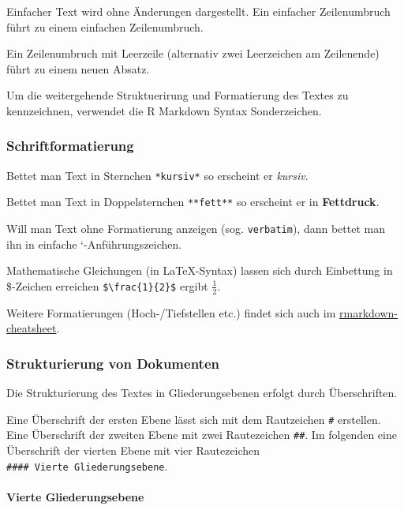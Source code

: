 \documentclass[
]{article}
\begin{document}
Einfacher Text wird ohne Änderungen dargestellt. Ein einfacher
Zeilenumbruch führt zu einem einfachen Zeilenumbruch.

Ein Zeilenumbruch mit Leerzeile (alternativ zwei Leerzeichen am
Zeilenende) führt zu einem neuen Absatz.

Um die weitergehende Struktuerirung und Formatierung des Textes zu
kennzeichnen, verwendet die R Markdown Syntax Sonderzeichen.

\hypertarget{schriftformatierung}{%
\subsubsection{Schriftformatierung}\label{schriftformatierung}}

Bettet man Text in Sternchen \texttt{*kursiv*} so erscheint er
\emph{kursiv}.

Bettet man Text in Doppelsternchen \texttt{**fett**} so erscheint er in
\textbf{Fettdruck}.

Will man Text ohne Formatierung anzeigen (sog. \texttt{verbatim}), dann
bettet man ihn in einfache `-Anführungszeichen.

Mathematische Gleichungen (in LaTeX-Syntax) lassen sich durch Einbettung
in \$-Zeichen erreichen \texttt{\$\textbackslash{}frac\{1\}\{2\}\$}
ergibt \(\frac{1}{2}\).

Weitere Formatierungen (Hoch-/Tiefstellen etc.) findet sich auch im
\href{https://github.com/rstudio/cheatsheets/raw/master/rmarkdown-2.0.pdf}{rmarkdown-cheatsheet}.

\hypertarget{strukturierung-von-dokumenten}{%
\subsubsection{Strukturierung von
Dokumenten}\label{strukturierung-von-dokumenten}}

Die Strukturierung des Textes in Gliederungsebenen erfolgt durch
Überschriften.

Eine Überschrift der ersten Ebene lässt sich mit dem Rautzeichen
\texttt{\#} erstellen. Eine Überschrift der zweiten Ebene mit zwei
Rautezeichen \texttt{\#\#}. Im folgenden eine Überschrift der vierten
Ebene mit vier Rautezeichen \texttt{\#\#\#\#\ Vierte\ Gliederungsebene}.

\hypertarget{vierte-gliederungsebene}{%
\paragraph{Vierte Gliederungsebene}\label{vierte-gliederungsebene}}
\end{document}
